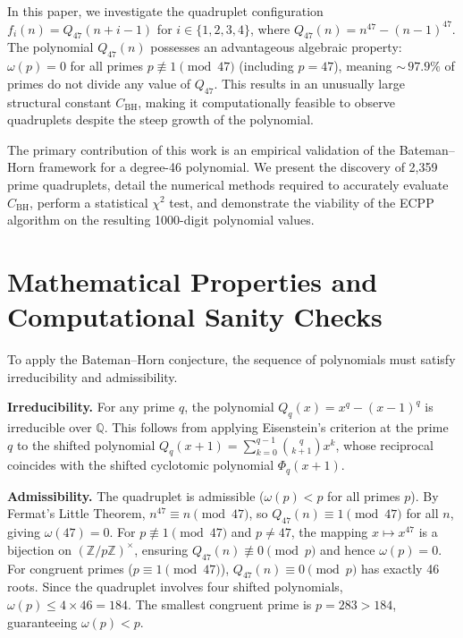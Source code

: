 \documentclass[11pt, a4paper]{article}
\begin{document}
In this paper, we investigate the quadruplet configuration $f_i(n) = Q_{47}(n+i-1)$ for $i \in \{1,2,3,4\}$, where $Q_{47}(n) = n^{47} - (n-1)^{47}$. The polynomial $Q_{47}(n)$ possesses an advantageous algebraic property: $\omega(p) = 0$ for all primes $p \not\equiv 1 \pmod{47}$ (including $p=47$), meaning ${\sim}\,97.9\%$ of primes do not divide any value of $Q_{47}$. This results in an unusually large structural constant $C_{\mathrm{BH}}$, making it computationally feasible to observe quadruplets despite the steep growth of the polynomial.

The primary contribution of this work is an empirical validation of the Bateman--Horn framework for a degree-46 polynomial. We present the discovery of 2{,}359 prime quadruplets, detail the numerical methods required to accurately evaluate $C_{\mathrm{BH}}$, perform a statistical $\chi^2$ test, and demonstrate the viability of the ECPP algorithm on the resulting 1000-digit polynomial values.

\section{Mathematical Properties and Computational Sanity Checks}\label{sec:prelim}

To apply the Bateman--Horn conjecture, the sequence of polynomials must satisfy irreducibility and admissibility.

\textbf{Irreducibility.}\; For any prime $q$, the polynomial $Q_q(x) = x^q - (x-1)^q$ is irreducible over $\mathbb{Q}$. This follows from applying Eisenstein's criterion at the prime $q$ to the shifted polynomial $Q_q(x+1) = \sum_{k=0}^{q-1}\binom{q}{k+1} x^k$, whose reciprocal coincides with the shifted cyclotomic polynomial $\Phi_q(x+1)$.

\textbf{Admissibility.}\; The quadruplet is admissible ($\omega(p) < p$ for all primes $p$). By Fermat's Little Theorem, $n^{47} \equiv n \pmod{47}$, so $Q_{47}(n) \equiv 1 \pmod{47}$ for all $n$, giving $\omega(47) = 0$. For $p \not\equiv 1 \pmod{47}$ and $p \neq 47$, the mapping $x \mapsto x^{47}$ is a bijection on $(\mathbb{Z}/p\mathbb{Z})^{\times}$, ensuring $Q_{47}(n) \not\equiv 0 \pmod{p}$ and hence $\omega(p) = 0$. For congruent primes ($p \equiv 1 \pmod{47}$), $Q_{47}(n) \equiv 0 \pmod p$ has exactly 46 roots. Since the quadruplet involves four shifted polynomials, $\omega(p) \le 4 \times 46 = 184$. The smallest congruent prime is $p = 283 > 184$, guaranteeing $\omega(p) < p$.
\end{document}
